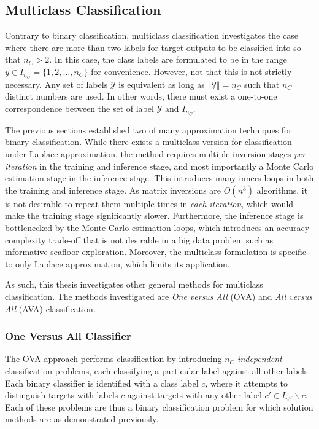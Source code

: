 		\subsection{Multiclass Classification}
		\label{BenthicHabitatMapping:Classification:MulticlassClassification}
		
			Contrary to binary classification, multiclass classification investigates the case where there are more than two labels for target outputs to be classified into so that $n_{C} > 2$. In this case, the class labels are formulated to be in the range $y \in I_{n_{C}} = \{1, 2, \dots, n_{C}\}$ for convenience. However, not that this is not strictly necessary. Any set of labels $\mathcal{Y}$ is equivalent as long as $\Vert \mathcal{Y} \Vert = n_{C}$ such that $n_{C}$ distinct numbers are used. In other words, there must exist a one-to-one correspondence between the set of label $\mathcal{Y}$ and $I_{n_{C}}$.
			
			The previous sections established two of many approximation techniques for binary classification. While there exists a multiclass version for classification under Laplace approximation, the method requires multiple inversion stages \textit{per iteration} in the training and inference stage, and most importantly a Monte Carlo estimation stage in the inference stage. This introduces many inners loops in both the training and inference stage. As matrix inversions are $O(n^{3})$ algorithms, it is not desirable to repeat them multiple times in \textit{each iteration}, which would make the training stage significantly slower. Furthermore, the inference stage is bottlenecked by the Monte Carlo estimation loops, which introduces an accuracy-complexity trade-off that is not desirable in a big data problem such as informative seafloor exploration. Moreover, the multiclass formulation is specific to only Laplace approximation, which limits its application.
			
			As such, this thesis investigates other general methods for multiclass classification. The methods investigated are \textit{One versus All} (OVA) and \textit{All versus All} (AVA) classification.
	
			\subsubsection{One Versus All Classifier}
			\label{BenthicHabitatMapping:Classification:MulticlassClassification:OVA}
						
				The OVA approach performs classification by introducing $n_{C}$ \textit{independent} classification problems, each classifying a particular label against all other labels. Each binary classifier is identified with a class label $c$, where it attempts to distinguish targets with labels $c$ against targets with any other label $c' \in I_{n^{C}} \backslash c$. Each of these problems are thus a binary classification problem for which solution methods are as demonstrated previously.
				
